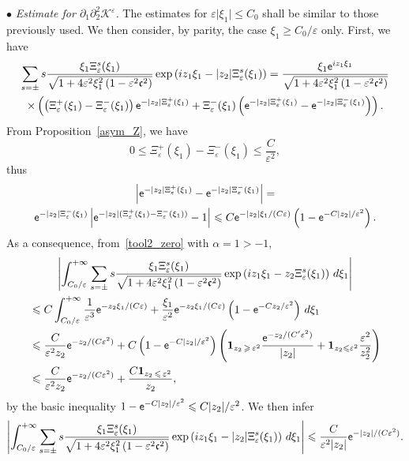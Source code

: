 \documentclass[AHL,Unicode,longabstracts,published]{cedram}
\newcommand*\p{\partial}
\newcommand*\BK{\mathcal{K}}
\newcommand{\bfun}{\mathbf{1}}
\newcommand*\ex{{\sf e}}
\newcommand*\cs{{\mathfrak c}}
\newcommand*\ii{\infty}
\newcommand*\gs{\geqslant }
\newcommand*\ls{\leqslant }
\newcommand*\e{\varepsilon}
\renewcommand*\a{\alpha}
\begin{document}
\vspace*{4pt}
\noindent $ \bullet $ \emph{Estimate for $ \p_1 \p_2^2 \BK^\e $.} The estimates for $ \e \lvert \xi_1 \rvert \ls C_0 $ shall be similar to those previously used. We then consider, by parity, the case $ \xi_1 \gs C_0 / \e $ only. First, we have
\begin{multline*}
\sum_{ s = \pm} s \frac{ \xi_1 \Xi_\e^s (\xi_1)}{\sqrt{1 + 4 \e^2 \xi_1^2 \left(1 - \e^2 \cs^2\right)}}
\exp\left(iz_1 \xi_1 - |z_2| \Xi_\e^s (\xi_1) \right)
= \frac{ \xi_1 \ex^{ iz_1 \xi_1}}{\sqrt{1 + 4 \e^2 \xi_1^2\left(1 - \e^2 \cs^2\right)}}
\\ \times
\left(\left(\Xi_\e^+ (\xi_1) - \Xi_\e^- (\xi_1)\right) \ex^{ - |z_2| \Xi_\e^+ (\xi_1)} + \Xi_\e^- (\xi_1) \left(\ex^{ - |z_2| \Xi_\e^+ (\xi_1)} - \ex^{- |z_2| \Xi_\e^- (\xi_1)}\right) \right).
\end{multline*}
From Proposition~\ref{asym_Z}, we have
\begin{equation}\label{conf1}
0 \ls \Xi_\e^+ (\xi_1) - \Xi_\e^- (\xi_1) \ls \frac{C}{\e^2},
\end{equation} thus
\begin{multline}\label{conf2}
\left\lvert \ex^{ - |z_2| \Xi_\e^+ (\xi_1) } - \ex^{ - |z_2| \Xi_\e^- (\xi_1) }\right\rvert  =\\ \ex^{ - |z_2| \Xi_\e^- (\xi_1) } \left\lvert \ex^{ - |z_2| (\Xi_\e^+ (\xi_1) - \Xi_\e^- (\xi_1)) } - 1\right\rvert
\ls C \ex^{ - |z_2| \xi_1/ (C\e) }\left(1 - \ex^{ - C |z_2| /\e^2}\right).
\end{multline}
As a consequence, from~\eqref{tool2_zero} with $ \a = 1 > - 1$,
\begin{multline*}
\left\lvert \int_{ C_0 / \e }^{+\ii}
\sum_{ s = \pm} s \frac{ \xi_1 \Xi_\e^s (\xi_1)}{\sqrt{1 + 4 \e^2 \xi_1^2 \left(1 - \e^2 \cs^2\right) } }
\exp\left(iz_1 \xi_1 - z_2 \Xi_\e^s (\xi_1)\right) \, d \xi_1 \right\rvert\\
\begin{aligned}
& \ls C \int_{ C_0/ \e }^{+\ii} \frac{1}{\e^3} \ex^{ - z_2 \xi_1/ (C\e) } + \frac{\xi_1}{\e^2} \ex^{ - z_2 \xi_1/ (C\e) } \left(1 - \ex^{ - C z_2 /\e^2}\right) \, d \xi_1
\\ &
\ls\frac{C}{\e^2 z_2 } \ex^{ - z_2 / (C\e^2) } + C \left(1 - \ex^{ - C |z_2| /\e^2}\right) \left(\bfun_{ z_2\,\gs\,\e^2} \frac{ \ex^{- z_2 / (C' \e^2)} }{|z_2|} + \bfun_{z_2 \ls \e^2} \frac{\e^2 }{ z_2^2 } \right)
\\ & \ls
\frac{C}{\e^2 z_2 } \ex^{ - z_2 / (C\e^2) } + \frac{ C \bfun_{z_2\,\ls\,\e^2} }{ z_2 },
\end{aligned}
\end{multline*}
by the basic inequality $ 1 - \ex^{ - C |z_2| /\e^2} \ls C |z_2| /\e^2 $. We then infer
\begin{align*}
\left\lvert \int_{C_0/ \e }^{+\ii}
\sum_{ s = \pm} s \frac{ \xi_1 \Xi_\e^s (\xi_1)}{\sqrt{1 + 4 \e^2 \xi_1^2 \left(1 - \e^2 \cs^2\right) } }
\exp\left(iz_1 \xi_1 - |z_2| \Xi_\e^s (\xi_1)\right) \, d \xi_1 \right\rvert
\ls \frac{C}{\e^2 |z_2| } \ex^{ - |z_2| / (C\e^2) }.
\end{align*}
\end{document}
